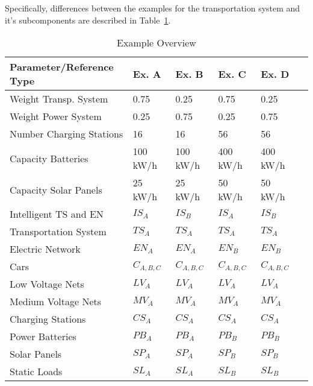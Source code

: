 Specifically, differences between the examples for the transportation system and it's subcomponents are described in Table~\ref{tab:example1}. 

\begin{table}[h]
	\renewcommand{\arraystretch}{1.3}
	\caption{Example Overview}
	\label{tab:example1}
	\centering
	\begin{tabular}{llllll}
		\hline
		\textbf{Parameter/Reference Type}                    & \textbf{Ex. A}    & \textbf{Ex. B} & \textbf{Ex. C} & \textbf{Ex. D}\\ \hline
		Weight Transp. System 			& 0.75	      & 0.25  	& 0.75	& 0.25\\
		Weight Power System 			& 0.25	      & 0.75  	& 0.25	& 0.75\\
		Number Charging Stations              & 16         & 16 		& 56	& 56\\
		Capacity Batteries          & 100 kW/h         & 100 kW/h 		& 400 kW/h		& 400 kW/h\\
		Capacity Solar Panels               & 25 kW/h         & 25 kW/h 		& 50 kW/h		& 50 kW/h	\\ \hline
		Intelligent TS and EN                 & $IS_{A}$         & $IS_{B}$ 		& $IS_{A}$		& $IS_{B}$	\\ 
		Transportation System                 & $TS_{A}$         & $TS_{A}$ 		& $TS_{A}$		& $TS_{A}$	\\ 
		Electric Network                & $EN_{A}$         & $EN_{A}$ 		& $EN_{B}$		& $EN_{B}$	\\ 
		Cars                  & $C_{A,B,C}$          & $C_{A,B,C}$		& $C_{A,B,C}$		& $C_{A,B,C}$	\\ 
		Low Voltage Nets                 & $LV_{A}$         & $LV_{A}$ 		& $LV_{A}$		& $LV_{A}$	\\ 
		Medium Voltage Nets                 & $MV_{A}$         & $MV_{A}$ 		& $MV_{A}$		& $MV_{A}$	\\ 
		Charging Stations                 & $CS_{A}$         & $CS_{A}$ 		& $CS_{A}$		& $CS_{A}$	\\ 
		Power Batteries                & $PB_{A}$         & $PB_{A}$ 		& $PB_{B}$		& $PB_{B}$	\\ 
		Solar Panels                 & $SP_{A}$         & $SP_{A}$ 		& $SP_{B}$		& $SP_{B}$	\\ 
		Static Loads                 & $SL_{A}$         & $SL_{A}$ 		& $SL_{B}$		& $SL_{B}$	\\ \hline
	\end{tabular}
\end{table}

